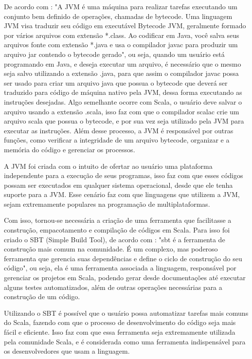 	De acordo com \cite{Sfregola2021}: "A JVM é uma máquina para realizar tarefas executando um conjunto bem definido de operações, chamadas de bytecode. Uma linguagem JVM visa traduzir seu código em executável Bytecode JVM, geralmente formado por vários arquivos com extensão *.class. Ao codificar em Java, você salva seus arquivos fonte com extensão *.java e usa o compilador javac para produzir um arquivo jar contendo o bytecode gerado", ou seja, quando um usuário está programando em Java, e deseja executar um arquivo, é necessário que o mesmo seja salvo utilizando a extensão .java, para que assim o compilador  javac possa ser usado para criar um arquivo java que possua o bytecode que deverá ser traduzido para código de máquina nativo pela JVM, dessa forma executando as instruções desejadas. Algo semelhante ocorre com Scala, o usuário deve salvar o arquivo usando a extensão .scala, isso faz com que o compilador scalac crie um arquivo scala que possua o bytecode, e por sua vez seja utilizado pela JVM para executar as instruções. Além desse processo, a JVM é responsável por outras funções, como verificar a integridade de um arquivo bytecode, organizar e a memória do código e gerenciar os processos.
	
	A JVM foi criada com o intuito de ofertar ao usuário uma plataforma independente para a execução de seus programas, isso faz com que esses códigos possam ser executados em qualquer sistema operacional, desde que ele tenha suporte para a JVM. Esse cenário faz com que linguagens que utilizem a JVM, sejam extremamente populares na programação de multiplataformas.
	
	Com isso, tornou-se necessária a criação de uma ferramenta que facilitasse a construção, empacotamento e compilação de códigos em Scala. Para isso foi criado o SBT (Simple Build Tool), de acordo com \cite{Sfregola2021}: "sbt é a ferramenta de construção mais comum na comunidade. É um complexo, mas poderoso ferramenta que gerencia suas dependências e define o ciclo de construção do seu código", ou seja, ela é uma ferramenta associada a linguagem, responsável por gerenciar os projetos em Scala, podendo gerar desde documentações até executar alguns testes automatizados, além de outras operações necessárias para a construção de um código.
	
	Utilizando o SBT é possível que o usuário possa automatizar tarefas mais comuns do Scala, fazendo com que o processo de desenvolvimento do código seja mais fácil e eficiente. Isso faz com que essa ferramenta seja extremamente utilizada pela comunidade Scala, e é considerada como uma ferramenta indispensável para os desenvolvedores que usam a linguagem.
	
